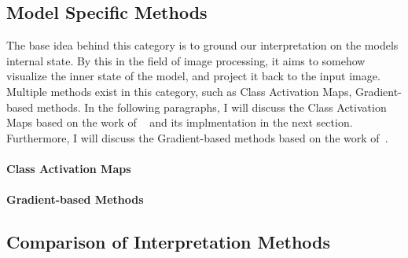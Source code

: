 \subsection{Model Specific Methods}\label{subsec:model-specific-methods}
The base idea behind this category is to ground our interpretation on the models internal state.
By this in the field of image processing, it aims to somehow visualize the inner state of the model, and project it back to the input image.
Multiple methods exist in this category, such as Class Activation Maps, Gradient-based methods.
In the following paragraphs, I will discuss the Class Activation Maps based on the work of
~\cite{BanyMuhammad2021EigenCAM} and its implmentation in the next section.
Furthermore, I will discuss the Gradient-based methods based on the work of~\cite{Selvaraju_2019}.


\paragraph{Class Activation Maps}\label{par:CAM}

\paragraph{Gradient-based Methods}\label{par:gradient-based-methods}


\subsection{Comparison of Interpretation Methods}\label{subsec:evaluation-interpretation-methods}
